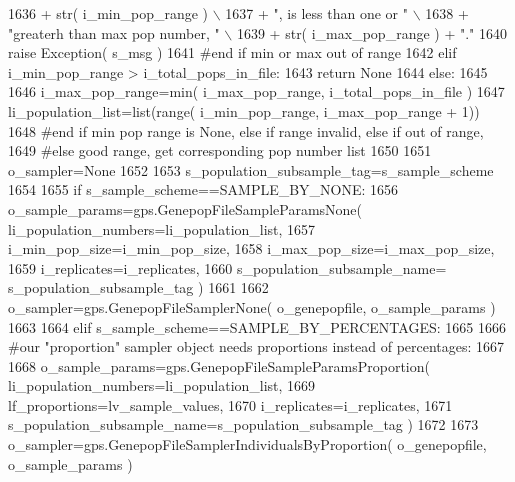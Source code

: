 \begin{DoxyCode}
1636                         + str( i\_min\_pop\_range ) \(\backslash\)
1637                         + \textcolor{stringliteral}{", is less than one or "} \(\backslash\)
1638                         + \textcolor{stringliteral}{"greaterh than max pop number, "} \(\backslash\)
1639                         + str( i\_max\_pop\_range ) + \textcolor{stringliteral}{"."} 
1640             \textcolor{keywordflow}{raise} Exception( s\_msg )
1641         \textcolor{comment}{#end if min or max out of range}
1642     \textcolor{keywordflow}{elif} i\_min\_pop\_range > i\_total\_pops\_in\_file:
1643         \textcolor{keywordflow}{return} \textcolor{keywordtype}{None}
1644     \textcolor{keywordflow}{else}:
1645 
1646         i\_max\_pop\_range=min( i\_max\_pop\_range, i\_total\_pops\_in\_file )
1647         li\_population\_list=list(range( i\_min\_pop\_range, i\_max\_pop\_range + 1))
1648     \textcolor{comment}{#end if min pop range is None, else if range invalid, else if out of range, }
1649     \textcolor{comment}{#else good range, get corresponding pop number list }
1650 
1651     o\_sampler=\textcolor{keywordtype}{None}  
1652 
1653     s\_population\_subsample\_tag=s\_sample\_scheme
1654 
1655     \textcolor{keywordflow}{if} s\_sample\_scheme==SAMPLE\_BY\_NONE:
1656         o\_sample\_params=gps.GenepopFileSampleParamsNone( li\_population\_numbers=li\_population\_list,
1657                                                             i\_min\_pop\_size=i\_min\_pop\_size,
1658                                                             i\_max\_pop\_size=i\_max\_pop\_size,
1659                                                             i\_replicates=i\_replicates,
1660                                                             s\_population\_subsample\_name=
      s\_population\_subsample\_tag )    
1661 
1662         o\_sampler=gps.GenepopFileSamplerNone( o\_genepopfile, o\_sample\_params )
1663 
1664     \textcolor{keywordflow}{elif} s\_sample\_scheme==SAMPLE\_BY\_PERCENTAGES:
1665 
1666         \textcolor{comment}{#our "proportion" sampler object needs proportions instead of percentages:}
1667 
1668         o\_sample\_params=gps.GenepopFileSampleParamsProportion( li\_population\_numbers=li\_population\_list,
1669                                                 lf\_proportions=lv\_sample\_values,
1670                                                 i\_replicates=i\_replicates,
1671                                                 s\_population\_subsample\_name=s\_population\_subsample\_tag )
1672 
1673         o\_sampler=gps.GenepopFileSamplerIndividualsByProportion( o\_genepopfile, o\_sample\_params )

\end{DoxyCode}
